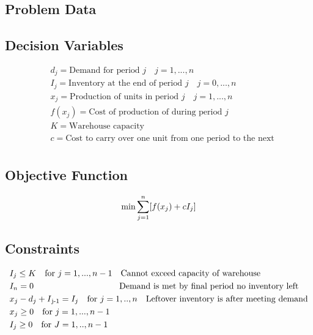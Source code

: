\documentclass[12pt]{article}
\begin{document}
\subsection{Problem Data}

\subsection{Decision Variables}
\begin{equation*}
        \begin{split}
            &d_j  = \text{Demand for period } j \quad j = 1,...,n\\
            &I_j  = \text{Inventory at the end of period } j \quad j= 0,...,n\\
            &x_j  = \text{Production of units in period } j \quad j = 1,...,n\\
            &f(x_j) = \text{Cost of production of during period } j\\
            &K = \text{Warehouse capacity}\\
            &c= \text{Cost to carry over one unit from one period to the next}\\
        \end{split}
    \end{equation*}
\subsection{Objective Function}
    \begin{equation*}
       \min \sum_{j=1}^{n} [f(x_j) + cI_j]\\
    \end{equation*}
\subsection{Constraints}
    \begin{align*}
       &I_j \leq K \quad \text{for } j=1,...,n-1 \quad \text{Cannot exceed capacity of warehouse}\\
       &I_n = 0 \quad \quad \quad \quad \quad \quad \quad \quad \quad \quad \text{Demand is met by final period no inventory left}\\
       &x_j - d_j + I\textsubscript{j-1} = I_j \quad \text{for } j = 1,..,n \quad \text{Leftover inventory is after meeting demand}\\
       &x_j \geq 0 \quad \text{for } j=1,...,n-1\\
       &I_j \geq 0 \quad \text{for } J=1,..,n-1\\
    \end{align*}
    
\end{document}
